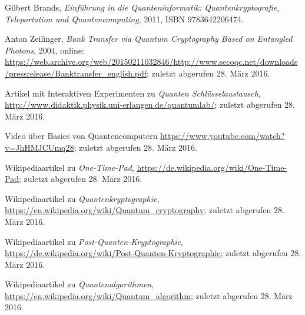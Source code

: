 \documentclass[letterpaper, 12pt]{article}
\begin{document}
\parindent 0pt
\parskip 6pt



\clearpage
\thispagestyle{empty}
\tableofcontents

\newpage
{}
\pagestyle{fancy}

%


\clearpage

\begin{thebibliography}{9}

    Gilbert Brands,
    \emph{Einführung in die Quanteninformatik: Quantenkryptografie, Teleportation und Quantencomputing},
    2011,
    ISBN 9783642206474.
    
    Anton Zeilinger,
    \emph{Bank Transfer via Quantum Cryptography Based on Entangled Photons}, 
    2004, 
    online: \url{https://web.archive.org/web/20150211032846/http://www.secoqc.net/downloads/pressrelease/Banktransfer_english.pdf};
    zuletzt abgerufen 28. März 2016.
    
    Artikel mit Interaktiven Experimenten zu \emph{Quanten Schlüsselaustausch},
    \url{http://www.didaktik.physik.uni-erlangen.de/quantumlab/};
    zuletzt abgerufen 28. März 2016.
    
    Video über Basics von Quantencomputern
    \url{https://www.youtube.com/watch?v=JhHMJCUmq28};
    zuletzt abgerufen 28. März 2016.
    
    Wikipediaartikel zu \emph{One-Time-Pad},
    \url{https://de.wikipedia.org/wiki/One-Time-Pad};
    zuletzt abgerufen 28. März 2016.
    
    Wikipediaartikel zu \emph{Quantenkryptographie},
    \url{https://en.wikipedia.org/wiki/Quantum_cryptography};
    zuletzt abgerufen 28. März 2016.
    
    Wikipediaartikel zu \emph{Post-Quanten-Kryptographie},
    \url{https://de.wikipedia.org/wiki/Post-Quanten-Kryptographie};
    zuletzt abgerufen 28. März 2016.
    
    Wikipediaartikel zu \emph{Quantenalgorithmen},
    \url{https://en.wikipedia.org/wiki/Quantum_algorithm};
    zuletzt abgerufen 28. März 2016.

\end{thebibliography}

\listoffigures
\end{document}
